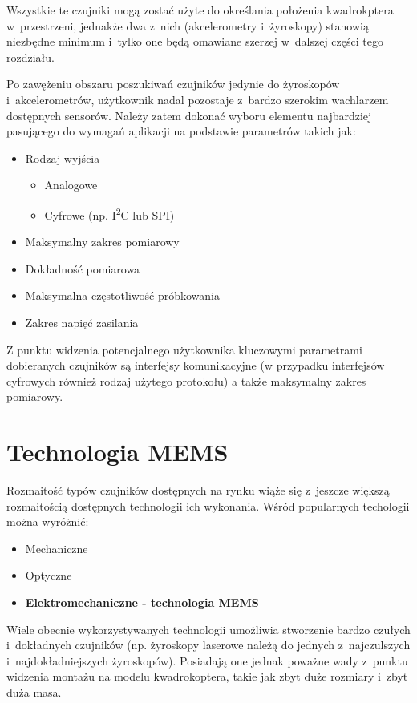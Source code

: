 Wszystkie te czujniki mogą zostać użyte do określania położenia kwadrokptera w~przestrzeni, jednakże dwa z~nich (akcelerometry i~żyroskopy) stanowią niezbędne minimum i~tylko one będą omawiane szerzej w~dalszej części tego rozdziału.

Po zawężeniu obszaru poszukiwań czujników jedynie do żyroskopów i~akcelerometrów, użytkownik nadal pozostaje z~bardzo szerokim wachlarzem dostępnych sensorów. Należy zatem dokonać wyboru elementu najbardziej pasującego do wymagań aplikacji na podstawie parametrów takich jak:

\begin{itemize}
	\item Rodzaj wyjścia
		\begin{itemize}
			\item Analogowe
			\item Cyfrowe (np. I\textsuperscript{2}C lub SPI)
		\end{itemize}
	\item Maksymalny zakres pomiarowy
	\item Dokładność pomiarowa
	\item Maksymalna częstotliwość próbkowania
	\item Zakres napięć zasilania
\end{itemize}

Z punktu widzenia potencjalnego użytkownika kluczowymi parametrami dobieranych czujników są interfejsy komunikacyjne (w przypadku interfejsów cyfrowych również rodzaj użytego protokołu) a także maksymalny zakres pomiarowy.

\section{Technologia MEMS}

Rozmaitość typów czujników dostępnych na rynku wiąże się z~jeszcze większą rozmaitością dostępnych technologii ich wykonania. Wśród popularnych techologii można wyróżnić:

\begin{itemize}
	\item Mechaniczne
	\item Optyczne
	\item \textbf{Elektromechaniczne - technologia MEMS}
\end{itemize}

Wiele obecnie wykorzystywanych technologii umożliwia stworzenie bardzo czułych i~dokładnych czujników (np. żyroskopy laserowe należą do jednych z~najczulszych i~najdokładniejszych żyroskopów). Posiadają one jednak poważne wady z~punktu widzenia montażu na modelu kwadrokoptera, takie jak zbyt duże rozmiary i~zbyt duża masa. 

